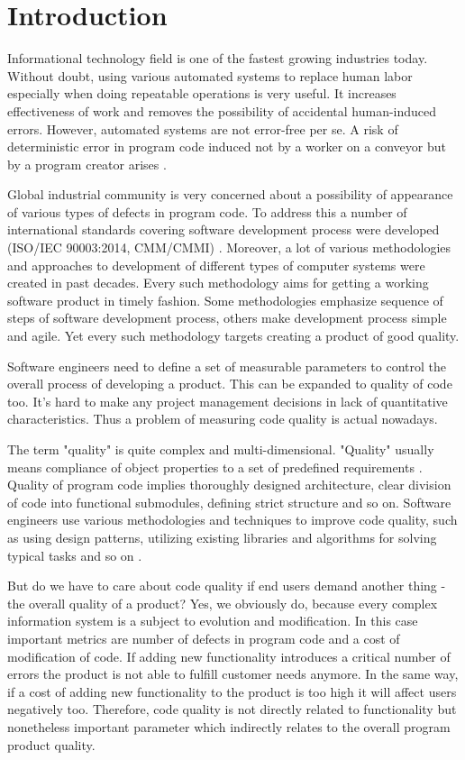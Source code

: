 \section{Introduction}
Informational technology field is one of the fastest growing industries today.
Without doubt, using various automated systems to replace human labor especially
when doing repeatable operations is very useful. It increases effectiveness
of work and removes the possibility of accidental human-induced errors.
However, automated systems are not error-free per se. A risk of deterministic
error in program code induced not by a worker on a conveyor but by
a program creator arises \cite{item01}.

Global industrial community is very concerned about a possibility of appearance
of various types of defects in program code. To address this a number of
international standards covering software development process
were developed (ISO/IEC 90003:2014, CMM/CMMI) \cite{item02}. Moreover, a lot of
various methodologies and approaches to development of different types
of computer systems were created in past decades. Every such methodology aims
for getting a working software product in timely fashion. Some methodologies
emphasize sequence of steps of software development process, others make
development process simple and agile. Yet every such methodology targets
creating a product of good quality.

Software engineers need to define a set of measurable parameters to control the overall process of developing a product. This can be expanded to quality of code too. It's hard
to make any project management decisions in lack of quantitative
characteristics. Thus a problem of measuring code quality is actual nowadays.

The term "quality" is quite complex and multi-dimensional. "Quality" usually
means compliance of object properties to a set of predefined requirements \cite{item03}.
Quality of program code implies thoroughly designed architecture, clear division
of code into functional submodules, defining strict structure and so on.
Software engineers use various methodologies and techniques to improve code
quality, such as using design patterns, utilizing existing libraries and
algorithms for solving typical tasks and so on \cite{item04}.

But do we have to care about code quality if end users demand another
thing - the overall quality of a product? Yes, we obviously do, because every
complex information system is a subject to evolution and modification. In this
case important metrics are number of defects in program code and a cost of
modification of code. If adding new functionality introduces a critical number
of errors the product is not able to fulfill customer needs anymore. In the
same way, if a cost of adding new functionality to the product is too high
it will affect users negatively too. Therefore, code quality is not directly
related to functionality but nonetheless important parameter which indirectly
relates to the overall program product quality.

